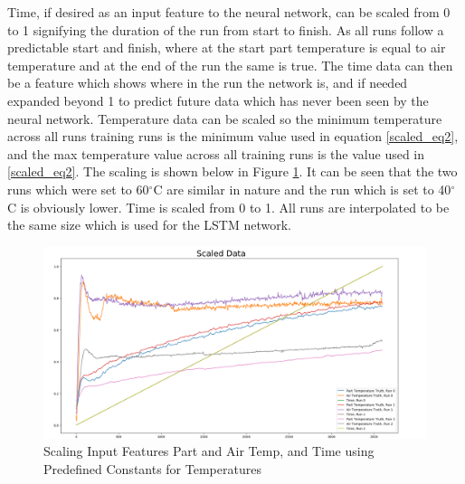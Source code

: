Time, if desired as an input feature to the neural network, can be scaled from 0 to 1 signifying the duration of the run from  start to finish. As all runs follow a predictable start and finish, where at the start part temperature is equal to air temperature and at the end of the run the same is true. The time data can then be a feature which shows where in the run the network is, and if needed expanded beyond 1 to predict future data which has never been seen by the neural network. Temperature data can be scaled so the minimum temperature across all runs training runs is the minimum value used in equation \ref{scaled_eq2}, and the max temperature value across all training runs is the value used in  \ref{scaled_eq2}. The scaling is shown below in Figure \ref{fig:scale1}. It can be seen that the two runs which were set to 60$^\circ$C are similar in nature and the run which is set to 40$^\circ$C is obviously lower. Time is scaled from 0 to 1. All runs are interpolated to be the same size which is used for the LSTM network.\\
\begin{figure}[h]
    \centering
    \vspace{-25pt}
    \centerline{\includegraphics[width=0.9\linewidth]{scaling/image1.png}}
    \caption{Scaling Input Features Part and Air Temp, and Time using Predefined Constants for Temperatures}
    \label{fig:scale1}
\end{figure}
\newpage
